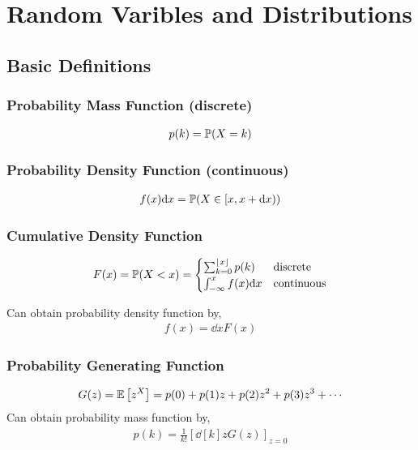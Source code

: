 \documentclass[12pt]{article}
\begin{document}
\maketitle

\pagebreak
\tableofcontents

\pagebreak
\section{Random Varibles and Distributions}
\subsection{Basic Definitions}
\subsubsection{Probability Mass Function (discrete)} 
\begin{align*}
    p(k) = \mathbb{P}(X = k)
\end{align*}

\subsubsection{Probability Density Function (continuous)} 
\begin{align*}
    f(x)\mathrm{d} x = \mathbb{P}(X \in [x,x+\mathrm{d} x))
\end{align*}

\subsubsection{Cumulative Density Function}
\begin{align*}
    F(x) = \mathbb{P}(X < x ) = 
    \begin{cases}
        \sum_{k=0}^{\lfloor x \rfloor} p(k) & \text{discrete} \\
        \int_{-\infty}^{x} f(x)\mathrm{d} x & \text{continuous}
    \end{cases}
\end{align*}

Can obtain probability density function by,
\begin{align*}
    f(x) = \dd{}{x} F(x)
\end{align*}


\subsubsection{Probability Generating Function}
\begin{align*}
    G(z) = \mathbb{E}\left[z^X\right] = p(0) + p(1)z + p(2)z^2 + p(3)z^3 + \cdots
\end{align*}
Can obtain probability mass function by,
\begin{align*}
    p(k) = \frac{1}{k!} \left[ \dd[k]{}{z} G(z) \right]_{z=0}
\end{align*}
\end{document}
